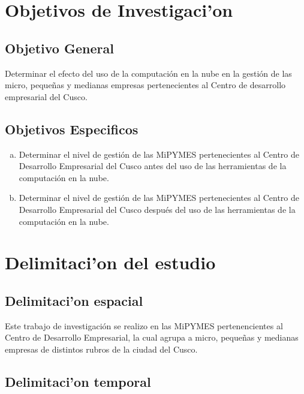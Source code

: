 \section{Objetivos de Investigaci'on}
\subsection{Objetivo General}
Determinar el efecto del uso de la computaci\'on en la nube en la gesti\'on de
las micro, peque\~nas y medianas empresas pertenecientes al Centro de desarrollo
empresarial del Cusco.
\subsection{Objetivos Especificos}
\begin{enumerate}[a.]
\item Determinar el nivel de gesti\'on de las MiPYMES pertenecientes al Centro de
Desarrollo Empresarial del Cusco antes del uso de las herramientas de la
computaci\'on en la nube.
\item Determinar el nivel de gesti\'on de las MiPYMES pertenecientes al Centro de
Desarrollo Empresarial del Cusco despu\'es del uso de las herramientas de la
computaci\'on en la nube.
\end{enumerate}
\section{Delimitaci'on del estudio}
\subsection{Delimitaci'on espacial}
Este trabajo de investigaci\'on se realizo en las MiPYMES pertenencientes al
Centro de Desarrollo Empresarial, la cual agrupa a micro, peque\~nas y
medianas empresas de distintos rubros de la ciudad del Cusco.

\subsection{Delimitaci'on temporal}
